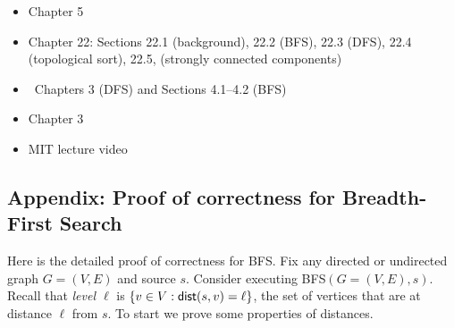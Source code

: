\documentclass[11pt]{article}
\begin{document}
\begin{itemize}
\item \JE Chapter 5
\item \CLRS Chapter 22: Sections 22.1 (background), 22.2 (BFS), 22.3 (DFS), 22.4 (topological sort), 22.5, (strongly connected components)
\item \DPV~Chapters 3 (DFS) and Sections 4.1--4.2 (BFS)
\item \KT Chapter 3
  
\item MIT lecture video
  



\end{itemize}

\subsection{Appendix: Proof of correctness for Breadth-First Search}

Here is the detailed proof of correctness for \textsf{BFS}.
Fix any directed or undirected graph $G=(V,E)$ and source $s$.
Consider executing \textsf{BFS}$(G=(V,E), s)$.
Recall that \emph{level $\ell$} is $\{v\in V: \operatorname{\sf dist}(s, v) = \ell\}$, the set of vertices that are at distance $\ell$ from $s$.
To start we prove some properties of distances.

\setcounter{lemma}{1}
\end{document}
